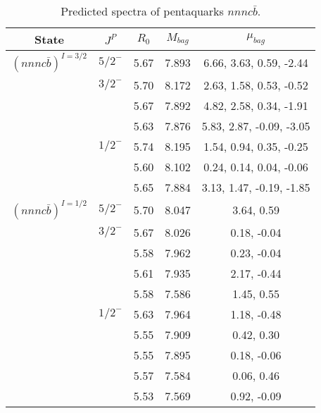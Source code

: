 \documentclass[prd,twocolumn,floatfix,nofootinbib]{revtex4}
\begin{document}
\renewcommand{\tabcolsep}{0.5cm}
\renewcommand{\arraystretch}{1.2}
\begin{table*}[!htbp]
    \caption{Predicted spectra of pentaquarks $nnnc\bar{b}$.}
    \begin{tabular}{ccccc}
        \hline\hline
        {\rm State} &$J^{P}$ &$R_{0}$ &$M_{bag}$ &$\mu_{bag}$ \\ \hline
        ${(nnnc\bar{b})}^{I=3/2}$
            &${5/2}^{-}$    &5.67  &7.893 &6.66, 3.63, 0.59, -2.44 \\
            &${3/2}^{-}$    &5.70   &8.172 &2.63, 1.58, 0.53, -0.52   \\
            &               &5.67   &7.892 &4.82, 2.58, 0.34, -1.91  \\
            &               &5.63   &7.876 &5.83, 2.87, -0.09, -3.05  \\
            &${1/2}^{-}$    &5.74   &8.195 &1.54, 0.94, 0.35, -0.25  \\
            &               &5.60   &8.102 &0.24, 0.14, 0.04, -0.06  \\
            &               &5.65   &7.884 &3.13, 1.47, -0.19, -1.85  \\
        ${(nnnc\bar{b})}^{I=1/2}$
            &${5/2}^{-}$    &5.70   &8.047 &3.64, 0.59 \\
            &${3/2}^{-}$    &5.67   &8.026 &0.18, -0.04 \\
            &               &5.58   &7.962 &0.23, -0.04  \\
            &               &5.61   &7.935 &2.17, -0.44  \\
            &               &5.58   &7.586 &1.45, 0.55  \\
            &${1/2}^{-}$    &5.63   &7.964 &1.18, -0.48  \\
            &               &5.55   &7.909 &0.42, 0.30  \\
            &               &5.55   &7.895 &0.18, -0.06  \\
            &               &5.57   &7.584 &0.06, 0.46  \\
            &               &5.53   &7.569 &0.92, -0.09  \\
        \hline\hline
    \end{tabular}
\end{table*}
\end{document}
